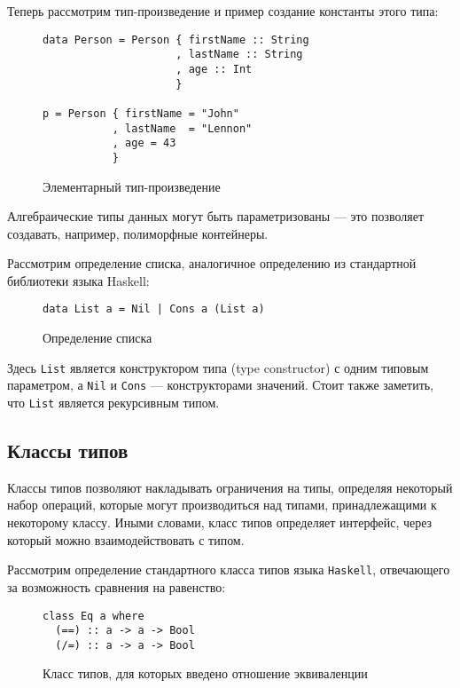 Теперь рассмотрим тип-произведение и пример создание константы этого типа:

\begin{figure}[h]
\begin{lstlisting}
data Person = Person { firstName :: String
                     , lastName :: String
                     , age :: Int
                     }

p = Person { firstName = "John"
           , lastName  = "Lennon"
           , age = 43
           }
\end{lstlisting}
\caption{Элементарный тип-произведение}
\label{listing:Bool}
\end{figure}

Алгебраические типы данных могут быть параметризованы --- это позволяет 
создавать, например, полиморфные контейнеры.

Рассмотрим определение списка, аналогичное определению из стандартной библиотеки 
языка Haskell:

\begin{figure}[h]
\begin{lstlisting}
data List a = Nil | Cons a (List a)
\end{lstlisting}
\caption{Определение списка}
\label{listing:List}
\end{figure}

Здесь \lstinline{List} является конструктором типа (type constructor) с одним 
типовым параметром, а \lstinline{Nil} и \lstinline{Cons} --- конструкторами 
значений. Стоит также заметить, что \lstinline{List} является рекурсивным типом.

\subsection{Классы типов}

Классы типов позволяют накладывать ограничения на типы, определяя некоторый 
набор операций, которые могут производиться над типами, принадлежащими к 
некоторому классу. Иными словами, класс типов определяет интерфейс, 
через который можно взаимодействовать с типом.

Рассмотрим определение стандартного класса типов языка \lstinline{Haskell}, 
отвечающего за возможность сравнения на равенство:

\begin{figure}[h]
\begin{lstlisting}
class Eq a where
  (==) :: a -> a -> Bool
  (/=) :: a -> a -> Bool
\end{lstlisting}
\caption{Класс типов, для которых введено отношение эквиваленции}
\label{listing:Eq}
\end{figure}

